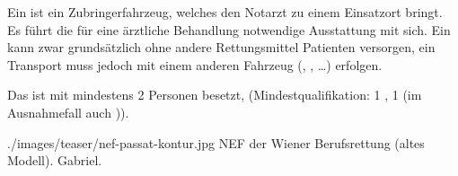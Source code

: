 {%
Ein  ist ein Zubringerfahrzeug, welches den Notarzt zu einem
Einsatzort bringt. Es führt die für eine ärztliche Behandlung
notwendige Ausstattung mit sich. Ein  kann zwar grundsätzlich
ohne andere Rettungsmittel Patienten versorgen, ein Transport muss
jedoch mit einem anderen Fahrzeug (, , \ldots) erfolgen.

Das  ist mit mindestens 2 Personen besetzt, (Mindestqualifikation: 1
, 1  (im Ausnahmefall auch )).




{\TakeNotesLarge}

}{

}
{./images/teaser/nef-passat-kontur.jpg}
{NEF der Wiener Berufsrettung (altes Modell).}
{Gabriel.}


